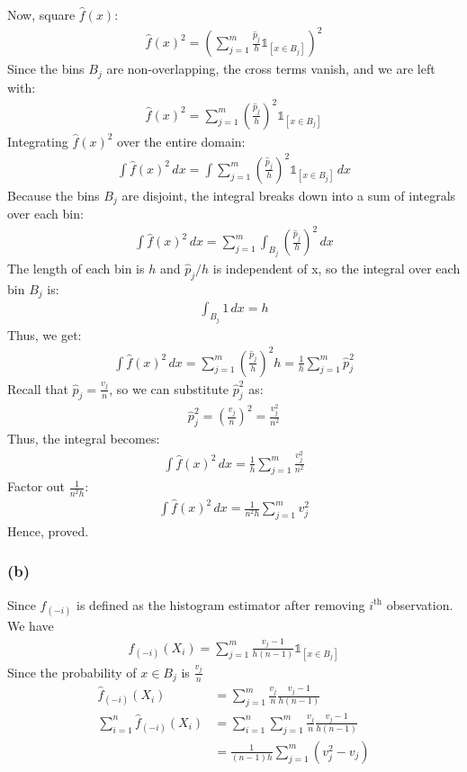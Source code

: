 Now, square \( \hat{f}(x) \):
\begin{align}
	\hat{f}(x)^2 = \left( \sum_{j=1}^{m} \frac{\hat{p}_j}{h} \mathbb{1}_{[x \in B_j]} \right)^2
\end{align}
Since the bins \( B_j \) are non-overlapping, the cross terms vanish, and we
are left with:
\begin{align}
	\hat{f}(x)^2 = \sum_{j=1}^{m} \left( \frac{\hat{p}_j}{h} \right)^2 \mathbb{1}_{[x \in B_j]}
\end{align}
Integrating \( \hat{f}(x)^2 \) over the entire domain:
\begin{align}
	\int \hat{f}(x)^2 \, dx = \int \sum_{j=1}^{m} \left( \frac{\hat{p}_j}{h} \right)^2 \mathbb{1}_{[x \in B_j]} \, dx
\end{align}
Because the bins \( B_j \) are disjoint, the integral breaks down into a sum of
integrals over each bin:
\begin{align}
	\int \hat{f}(x)^2 \, dx = \sum_{j=1}^{m} \int_{B_j} \left( \frac{\hat{p}_j}{h} \right)^2 \, dx
\end{align}
The length of each bin is  $h$ and $ \hat{p}_{j}/h $ is independent of x, so
the integral over each bin $B_j$  is:
\begin{align}
	\int_{B_j} 1 \, dx = h
\end{align}
Thus, we get:
\begin{align}
	\int \hat{f}(x)^2 \, dx = \sum_{j=1}^{m} \left( \frac{\hat{p}_j}{h} \right)^2 h = \frac{1}{h} \sum_{j=1}^{m} \hat{p}_j^2
\end{align}
Recall that \( \hat{p}_j = \frac{v_j}{n} \), so we can substitute \( \hat{p}_j^2 \) as:
\begin{align}
	\hat{p}_j^2 = \left( \frac{v_j}{n} \right)^2 = \frac{v_j^2}{n^2}
\end{align}
Thus, the integral becomes:
\begin{align}
	\int \hat{f}(x)^2 \, dx = \frac{1}{h} \sum_{j=1}^{m} \frac{v_j^2}{n^2}
\end{align}
Factor out \( \frac{1}{n^2 h} \):
\begin{align}
	\int \hat{f}(x)^2 \, dx = \frac{1}{n^2 h} \sum_{j=1}^{m} v_j^2
\end{align}
Hence, proved.

\subsubsection{(b)}
Since $\hat{f}_{(-i)}$ is defined as the histogram estimator after removing $i^\text{th}$ observation. 
We have
\begin{align}
	\hat{f}_{(-i)}(X_i) = \sum_{j=1}^{m} \frac{v_j-1}{h(n-1)} \mathbb{1}_{[x \in B_j]}
\end{align}
Since the probability of $x\in B_j$ is $\frac{v_j}{n}$
\begin{align}
	\hat{f}_{(-i)}(X_i)             & = \sum_{j=1}^{m} \frac{v_j}{n} \frac{v_j-1}{h(n-1)}             \\
	\sum_{i=1}^n\hat{f}_{(-i)}(X_i) & =\sum_{i=1}^n \sum_{j=1}^{m} \frac{v_j}{n} \frac{v_j-1}{h(n-1)} \\
	                                & = \frac{1}{(n-1)h}\sum_{j=1}^m (v_j^2 - v_j)
\end{align}

